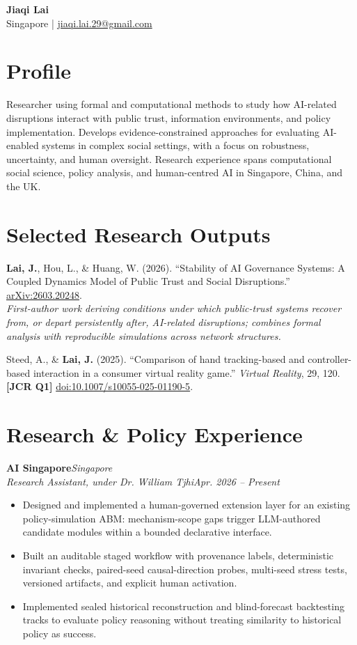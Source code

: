 \documentclass[11pt,a4paper]{article}
\newcommand{\cvheading}[4]{%
  \noindent\textbf{#1}\hfill\textit{#2}\\[-1pt]
  \textit{#3}\hfill\textit{#4}\\[-5pt]
}
\begin{document}
\begin{center}
  {\LARGE\bfseries Jiaqi Lai}\\[3pt]
  Singapore \quad|\quad
  \href{mailto:jiaqi.lai.29@gmail.com}{jiaqi.lai.29@gmail.com}
\end{center}

\vspace{-2pt}
\section{Profile}
Researcher using formal and computational methods to study how AI-related disruptions interact with public trust, information environments, and policy implementation. Develops evidence-constrained approaches for evaluating AI-enabled systems in complex social settings, with a focus on robustness, uncertainty, and human oversight. Research experience spans computational social science, policy analysis, and human-centred AI in Singapore, China, and the UK.

\section{Selected Research Outputs}
\textbf{Lai, J.}, Hou, L., \& Huang, W. (2026). ``Stability of AI Governance Systems: A Coupled Dynamics Model of Public Trust and Social Disruptions.'' \href{https://arxiv.org/abs/2603.20248}{arXiv:2603.20248}.\\[-1pt]
\textit{First-author work deriving conditions under which public-trust systems recover from, or depart persistently after, AI-related disruptions; combines formal analysis with reproducible simulations across network structures.}

\vspace{3pt}
Steed, A., \& \textbf{Lai, J.} (2025). ``Comparison of hand tracking-based and controller-based interaction in a consumer virtual reality game.'' \textit{Virtual Reality}, 29, 120. \textbf{[JCR Q1]} \href{https://doi.org/10.1007/s10055-025-01190-5}{doi:10.1007/s10055-025-01190-5}.

\section{Research \& Policy Experience}
\cvheading{AI Singapore}{Singapore}{Research Assistant, under Dr. William Tjhi}{Apr. 2026 -- Present}
\begin{itemize}
  \item Designed and implemented a human-governed extension layer for an existing policy-simulation ABM: mechanism-scope gaps trigger LLM-authored candidate modules within a bounded declarative interface.
  \item Built an auditable staged workflow with provenance labels, deterministic invariant checks, paired-seed causal-direction probes, multi-seed stress tests, versioned artifacts, and explicit human activation.
  \item Implemented sealed historical reconstruction and blind-forecast backtesting tracks to evaluate policy reasoning without treating similarity to historical policy as success.
\end{itemize}
\end{document}
